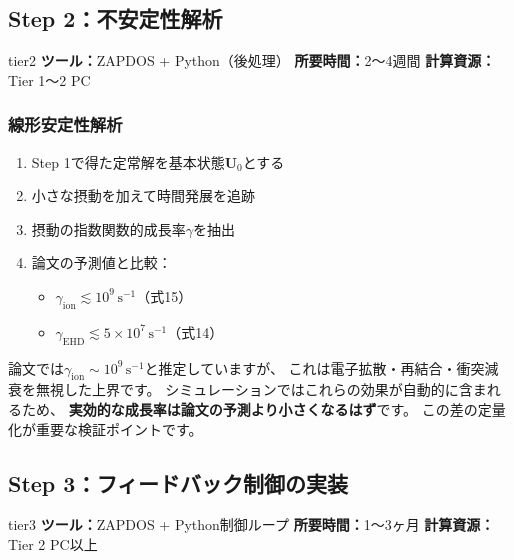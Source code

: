 \documentclass[12pt,a4paper]{ltjsarticle}
\begin{document}
\subsection{Step 2：不安定性解析}

\begin{tierbox}{tier2}
\textbf{ツール：}ZAPDOS + Python（後処理） \quad
\textbf{所要時間：}2〜4週間 \quad
\textbf{計算資源：}Tier 1〜2 PC
\end{tierbox}

\subsubsection{線形安定性解析}

\begin{enumerate}[leftmargin=2em]
  \item Step 1で得た定常解を基本状態$\mathbf{U}_0$とする
  \item 小さな摂動を加えて時間発展を追跡
  \item 摂動の指数関数的成長率$\gamma$を抽出
  \item 論文の予測値と比較：
    \begin{itemize}
      \item $\gamma_{\mathrm{ion}} \lesssim 10^9\,\mathrm{s}^{-1}$（式15）
      \item $\gamma_{\mathrm{EHD}} \lesssim 5 \times 10^7\,\mathrm{s}^{-1}$（式14）
    \end{itemize}
\end{enumerate}

\begin{infobox}[論文の予測が上界推定であることの検証]
論文では$\gamma_{\mathrm{ion}} \sim 10^9\,\mathrm{s}^{-1}$と推定していますが、
これは電子拡散・再結合・衝突減衰を無視した上界です。
シミュレーションではこれらの効果が自動的に含まれるため、
\textbf{実効的な成長率は論文の予測より小さくなるはず}です。
この差の定量化が重要な検証ポイントです。
\end{infobox}

\subsection{Step 3：フィードバック制御の実装}

\begin{tierbox}{tier3}
\textbf{ツール：}ZAPDOS + Python制御ループ \quad
\textbf{所要時間：}1〜3ヶ月 \quad
\textbf{計算資源：}Tier 2 PC以上
\end{tierbox}
\end{document}
